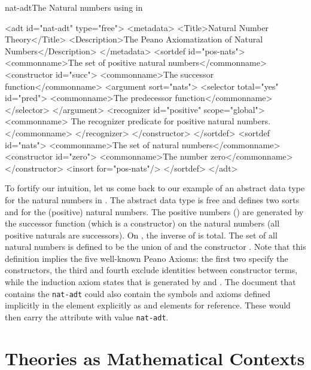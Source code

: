 \begin{myfig}{nat-adt}{The Natural numbers using {} in {\omdoc}}
  \footnotesize
\begin{boxedverbatim}
<adt id="nat-adt" type="free">
 <metadata>
  <Title>Natural Number Theory</Title>
  <Description>The Peano Axiomatization of Natural Numbers</Description>
 </metadata>
 <sortdef id="pos-nats">
  <commonname>The set of positive natural numbers</commonname>
  <constructor id="succ">
   <commonname>The successor function</commonname>
   <argument sort="nats">
    <selector total="yes" id="pred">
     <commonname>The predecessor function</commonname>
    </selector>
   </argument>
   <recognizer id="positive" scope="global">
    <commonname>
     The recognizer predicate for positive natural numbers.
    </commonname>
   </recognizer>
  </constructor>
 </sortdef>
 <sortdef id="nats">
  <commonname>The set of natural numbers</commonname>
  <constructor id="zero">
   <commonname>The number zero</commonname>
  </constructor>
  <insort for="pos-nats"/>
 </sortdef>
</adt>
\end{boxedverbatim}
\end{myfig}
To fortify our intuition, let us come back to our example of an abstract data type
for the natural numbers in {}.  The abstract data type
{} is free and defines two sorts {} and {}
for the (positive) natural numbers. The positive numbers ({}) are
generated by the successor function (which is a constructor) on the natural
numbers (all positive naturals are successors). On {}, the inverse
{} of {} is total.  The set {} of all natural
numbers is defined to be the union of {} and the constructor
{}. Note that this definition implies the five well-known Peano Axioms:
the first two specify the constructors, the third and fourth exclude identities
between constructor terms, while the induction axiom states that {} is
generated by {} and {}.  The document that contains the
{\tt{nat-adt}} could also contain the symbols and axioms defined implicitly in the
{} element explicitly as {} and {}
elements for reference. These would then carry the
{} attribute with value {\tt{nat-adt}}.


\section{Theories as Mathematical Contexts}\label{sec:theories}

